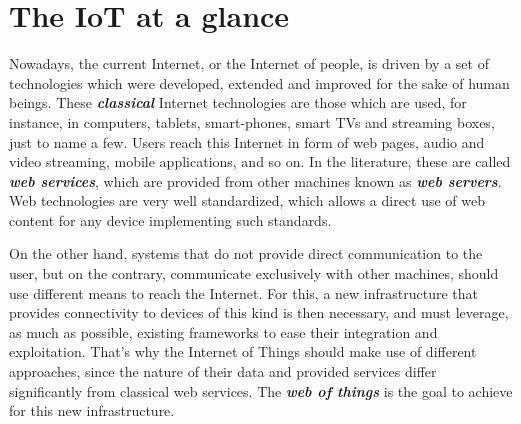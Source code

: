 


\section{The IoT at a glance}
\label{subsec:IoTAtAGlance}
Nowadays, the current Internet, or the Internet of people, is driven by a set of technologies which were developed, extended and improved for the sake of human beings.
These \textit{\textbf{classical}} Internet technologies are those which are used, for instance, in computers, tablets, smart-phones, smart TVs and streaming boxes, just to name a few.
Users reach this Internet in form of web pages, audio and video streaming, mobile applications, and so on.
In the literature, these are called \textit{\textbf{web services}}, which are provided from other machines known as \textit{\textbf{web servers}}.
Web technologies are very well standardized, which allows a direct use of web content for any device implementing such standards.

On the other hand, systems that do not provide direct communication to the user, but on the contrary, communicate exclusively with other machines, should use different means to reach the Internet.
For this, a new infrastructure that provides connectivity to devices of this kind is then necessary, and must leverage, as much as possible, existing frameworks to ease their integration and exploitation.
That's why the Internet of Things should make use of different approaches, since the nature of their data and provided services differ significantly from classical web services.
The \textit{\textbf{web of things}} \cite{duquennoy2009webofthings} is the goal to achieve for this new infrastructure.

